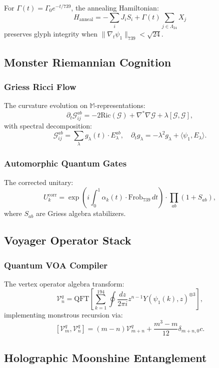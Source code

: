 \documentclass[12pt]{article}
\begin{document}
\begin{center}
\begin{theorem}
For $\Gamma(t) = \Gamma_0 e^{-t/739}$, the annealing Hamiltonian:
\[
H_{\text{anneal}} = -\sum_i J_i S_i + \Gamma(t) \sum_{j \in \Lambda_{24}} X_j
\]
preserves glyph integrity when $\|\nabla_t \psi_1\|_{739} < \sqrt{24}$.
\end{theorem}

\subsection{Monster Riemannian Cognition}
\subsubsection{Griess Ricci Flow}
The curvature evolution on $\mathbb{M}$-representations:
\[
\partial_t \mathcal{G}^{ab}_{ij} = -2\text{Ric}(\mathcal{G}) + \nabla^* \nabla \mathcal{G} + \lambda [\mathcal{G}, \mathcal{G}],
\]
with spectral decomposition:
\[
\mathcal{G}^{ab}_{ij} = \sum_{\lambda} g_\lambda(t) \cdot E_\lambda^{ab}, \quad \partial_t g_\lambda = -\lambda^2 g_\lambda + \langle \psi_1, E_\lambda \rangle.
\]

\subsubsection{Automorphic Quantum Gates}
The corrected unitary:
\[
U_k^{\text{corr}} = \exp\left(i \int_0^1 \alpha_k(t) \cdot \text{Frob}_{739} \, dt \right) \cdot \prod_{ab} (1 + S_{ab}),
\]
where $S_{ab}$ are Griess algebra stabilizers.

\subsection{Voyager Operator Stack}
\subsubsection{Quantum VOA Compiler}
The vertex operator algebra transform:
\[
\mathcal{V}_n^q = \text{QFT} \left[ \sum_{k=1}^{194} \oint \frac{dz}{2\pi i} z^{n-1} Y(\psi_1(k), z)^{\otimes 3} \right],
\]
implementing monstrous recursion via:
\[
[\mathcal{V}_m^q, \mathcal{V}_n^q] = (m - n)\mathcal{V}_{m+n}^q + \frac{m^3 - m}{12} \delta_{m+n,0}c.
\]

\subsection{Holographic Moonshine Entanglement}

\end{center}
\end{document}
